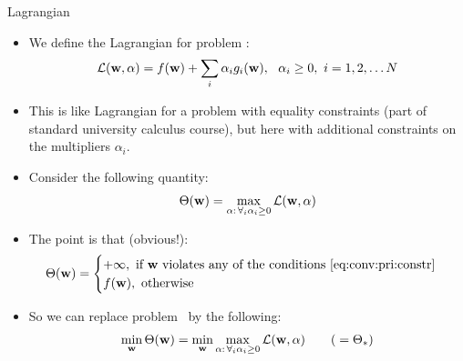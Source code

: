 \documentclass[handout]{beamer}   %
\def\L{\mathcal{L}}
\def\argmin{\mathop{\rm arg\,min}\limits}
\def\b#1{{\bf #1}}
\begin{document}
\begin{frame}{Lagrangian}
  \begin{itemize}
  \item We define the Lagrangian for problem \convprimary:
    \begin{equation*}
      \L(\b w,\alpha) = f(\b w) + \sum_i \alpha_i g_i(\b w), \ \
      \alpha_i\ge 0, \ i=1,2,\ldots N
    \end{equation*}
    
    \pause
  \item This is like Lagrangian for a problem with equality constraints
    (part of standard university calculus course), but here with additional
    constraints on the multipliers $\alpha_i$.
    
    \pause
  \item Consider the following quantity:
    \begin{equation*}
      \Theta(\b w) = \max_{\alpha:\,\forall_i\alpha_i\ge 0} \L(\b w, \alpha)
    \end{equation*}
    
    \pause
  \item The point is that (obvious!):
    \begin{equation*}
      \Theta(\b w) =
      \begin{cases}
        +\infty,\
        \hbox{\rm if $\b w$ violates any of the conditions \eqref{eq:conv:pri:constr}}\\
        f(\b w),\
        \hbox{otherwise}
      \end{cases}
    \end{equation*}
    
    \pause
  \item So we can replace problem \convprimary\ by the following:
    \begin{equation*}
      \min_{\b w} \Theta(\b w) = \min_{\b w} \max_{\alpha:\,\forall_i\alpha_i\ge 0} \L(\b w, \alpha)
      \qquad ({}=\Theta_*)
    \end{equation*}
  \end{itemize}
\end{frame}
\end{document}
